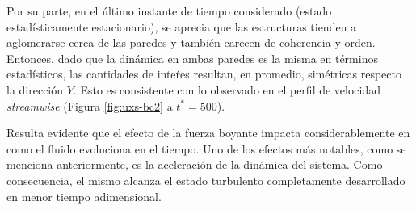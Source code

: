 Por su parte, en el último instante de tiempo considerado (estado estadísticamente estacionario), se aprecia que las estructuras  tienden a aglomerarse cerca de las paredes y también carecen de coherencia y orden. Entonces, dado que la dinámica en ambas paredes es la misma en términos estadísticos, las cantidades de inteŕes resultan, en promedio, simétricas respecto la dirección $Y$. Esto es consistente con lo observado en el perfil de velocidad \textit{streamwise} (Figura \ref{fig:uxs-bc2} a $t^*=500$).

Resulta evidente que el efecto de la fuerza boyante impacta considerablemente en como el fluido evoluciona en el tiempo. Uno de los efectos más notables, como se menciona anteriormente, es la aceleración de la dinámica del sistema. Como consecuencia, el mismo alcanza el estado turbulento completamente desarrollado en menor tiempo adimensional.  


